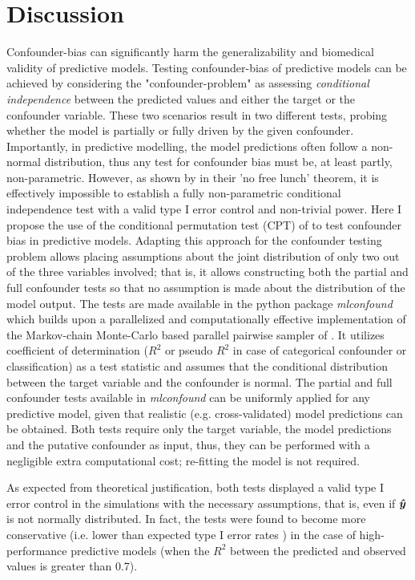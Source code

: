 \documentclass{article}
\begin{document}
\section{Discussion}

Confounder-bias can significantly harm the generalizability and biomedical validity of predictive models. Testing confounder-bias of predictive models can be achieved by considering the "confounder-problem" as assessing \emph{conditional independence} between the predicted values and either the target or the confounder variable. These two scenarios result in two different tests, probing whether the model is partially or fully driven by the given confounder.
Importantly, in predictive modelling, the model predictions often follow a non-normal distribution, thus any test for confounder bias must be, at least partly, non-parametric.
However, as shown by \citet{shah2020hardness} in their 'no free lunch' theorem, it is effectively impossible to establish a fully non-parametric conditional independence test with a valid type I error control and non-trivial power.
Here I propose the use of the conditional permutation test (CPT) of \cite{berrett2020conditional} to test confounder bias in predictive models. Adapting this approach for the confounder testing problem allows placing assumptions about the joint distribution of only two out of the three variables involved; that is, it allows constructing both the partial and full confounder tests so that no assumption is made about the distribution of the model output. 
The tests are made available in the python package \emph{mlconfound} which builds upon a parallelized and computationally effective implementation of the Markov-chain Monte-Carlo based parallel pairwise sampler of \cite{berrett2020conditional}. It utilizes coefficient of determination ($R^2$ or pseudo $R^2$ in case of categorical confounder or classification) as a test statistic and assumes that the conditional distribution between the target variable and the confounder is normal. The partial and full confounder tests available in \emph{mlconfound} can be uniformly applied for any predictive model, given that realistic (e.g. cross-validated) model predictions can be obtained. Both tests require only the target variable, the model predictions and the putative confounder as input, thus, they can be performed with a negligible extra computational cost; re-fitting the model is not required.

As expected from theoretical justification, both tests displayed a valid type I error control in the simulations with the necessary assumptions, that is, even if $\boldsymbol{\hat{y}}$ is not normally distributed. In fact, the tests were found to become more conservative (i.e. lower than expected type I error rates ) in the case of high-performance predictive models (when the $R^2$ between the predicted and observed values is greater than 0.7). 
\end{document}
